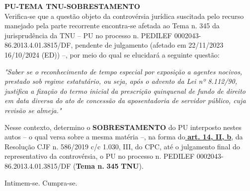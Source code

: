 \documentclass[12pt]{article}
\begin{document}
\justifying
{\Large\bfseries \textbf{PU-TEMA TNU-SOBRESTAMENTO}}\\

\noindent Verifica-se que a questão objeto da controvérsia jurídica suscitada pelo recurso manejado pela parte recorrente encontra-se afetada ao Tema n. 345 da jurisprudência da TNU – PU no processo n. PEDILEF 0002043-86.2013.4.01.3815/DF, pendente de julgamento (afetado em 22/11/2023 16/10/2024 (ED)) –, por meio do qual se elucidará a seguinte questão:

\noindent \textit{"Saber se o reconhecimento de tempo especial por exposição a agentes nocivos, prestado sob regime estatutário, ou seja, após o advento da Lei nº 8.112/90, justifica a fixação do termo inicial da prescrição quinquenal de fundo de direito em data diversa do ato de concessão da aposentadoria de servidor público, cuja revisão se almeja."}

\noindent Nesse contexto, determino o \textbf{SOBRESTAMENTO} do PU interposto nestes autos – o qual versa sobre a mesma matéria –, na forma do\uline{\textbf{ art. 14, II, b}}, da Resolução CJF n. 586/2019 c/c 1.030, III, do CPC, até o julgamento final do representativo da controvérsia, o PU no processo n. PEDILEF 0002043-86.2013.4.01.3815/DF (\textbf{Tema n. }\textbf{345 }\textbf{TNU}).

\noindent Intimem-se. Cumpra-se.
\end{document}
